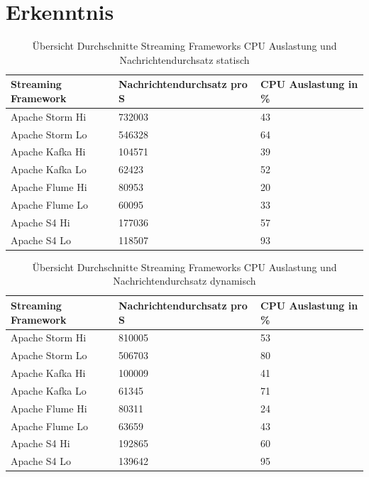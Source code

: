 \section{Erkenntnis}


\begin{table}[tbp]
	\centering
		\begin{tabular}{@{}lll@{}} \toprule
			\textbf{Streaming Framework} & \textbf{Nachrichtendurchsatz pro S} & \textbf{CPU Auslastung in \%} \\ \midrule
			Apache Storm Hi & 732003 & 43 \\
			Apache Storm Lo & 546328 & 64 \\
			Apache Kafka Hi & 104571 & 39 \\
			Apache Kafka Lo & 62423 & 52 \\
			Apache Flume Hi & 80953 & 20 \\
			Apache Flume Lo & 60095 & 33 \\
			Apache S4 Hi & 177036 & 57 \\
			Apache S4 Lo & 118507 & 93 \\
			\bottomrule			
		\end{tabular}
	\caption{Übersicht Durchschnitte Streaming Frameworks CPU Auslastung und Nachrichtendurchsatz statisch}
	\label{tab:avgSta}
\end{table}

\begin{table}[tbp]
	\centering
		\begin{tabular}{@{}lll@{}} \toprule
			\textbf{Streaming Framework} & \textbf{Nachrichtendurchsatz pro S} & \textbf{CPU Auslastung in \%} \\ \midrule
			Apache Storm Hi & 810005 & 53 \\
			Apache Storm Lo & 506703 & 80 \\
			Apache Kafka Hi & 100009 & 41 \\
			Apache Kafka Lo & 61345 & 71 \\
			Apache Flume Hi & 80311 & 24 \\
			Apache Flume Lo & 63659 & 43 \\
			Apache S4 Hi & 192865 & 60 \\
			Apache S4 Lo & 139642 & 95 \\
			\bottomrule			
		\end{tabular}
	\caption{Übersicht Durchschnitte Streaming Frameworks CPU Auslastung und Nachrichtendurchsatz dynamisch}
	\label{tab:avgDyn}
\end{table}
